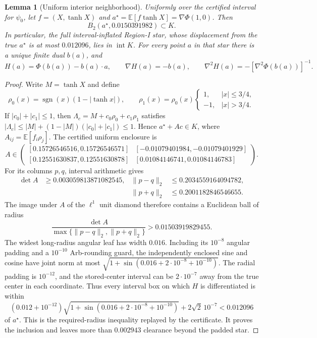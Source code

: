 \documentclass[11pt]{article}
\newtheorem{lemma}[theorem]{Lemma}
\newcommand{\E}{\mathbb{E}}
\begin{document}
\begin{lemma}[Uniform interior neighborhood]\label{lem:star-interior}
Uniformly over the certified interval for $\psi_0$, let $f=(X,\tanh X)$ and
$a^\star=\E[f\tanh X]=\nabla\Phi(1,0)$.  Then
\[
 B_2(a^\star,0.0150391982)\subset K.
\]
In particular, the full interval-inflated Region-I star, whose displacement
from the true $a^\star$ is at most
$0.012096$, lies in $\operatorname{int}K$.
For every point $a$ in that star there is a unique finite dual $b(a)$, and
\[
 H(a)=\Phi(b(a))-b(a)\cdot a,\qquad
 \nabla H(a)=-b(a),\qquad
 \nabla^2H(a)=-[\nabla^2\Phi(b(a))]^{-1}.
\]
\end{lemma}
\begin{proof}
Write $M=\tanh X$ and define
\[
 \rho_0(x)=\operatorname{sgn}(x)(1-|\tanh x|),\qquad
 \rho_1(x)=\rho_0(x)
 \begin{cases}1,&|x|\le3/4,\\-1,&|x|>3/4.
 \end{cases}
\]
If $|c_0|+|c_1|\le1$, then
$\Lambda_c=M+c_0\rho_0+c_1\rho_1$ satisfies
$|\Lambda_c|\le |M|+(1-|M|)(|c_0|+|c_1|)\le1$.  Hence
$a^\star+Ac\in K$, where $A_{ij}=\E[f_i\rho_j]$.  The certified uniform
enclosure is
\[
A\in\begin{pmatrix}
[0.15726546516,0.15726546571]&
[-0.01079401984,-0.01079401929]\\
[0.12551630837,0.12551630878]&
[0.01084146741,0.01084146783]
\end{pmatrix}.
\]
For its columns $p,q$, interval arithmetic gives
\[
 \begin{aligned}
 \det A&\ge0.003059813871082545,&
 \|p-q\|_2&\le0.2034559164094782,\\
 &&\|p+q\|_2&\le0.2001182846546655.
 \end{aligned}
\]
The image under $A$ of the $\ell^1$ unit diamond therefore contains a
Euclidean ball of radius
\[
 \frac{\det A}{\max\{\|p-q\|_2,\|p+q\|_2\}}
 >0.01503919829455.
\]
The widest long-radius angular leaf has width $0.016$.  Including its
$10^{-8}$ angular padding and a $10^{-10}$ Arb-rounding guard, the independently
enclosed sine and cosine have joint norm at most
$\sqrt{1+\sin(0.016+2\cdot10^{-8}+10^{-10})}$.  The radial padding is
$10^{-12}$, and the stored-center interval can be $2\cdot10^{-7}$ away
from the true center in each coordinate.  Thus every interval box on which
$H$ is differentiated is within
\[
 (0.012+10^{-12})\sqrt{1+\sin(0.016+2\cdot10^{-8}+10^{-10})}
 +2\sqrt2\,10^{-7}<0.012096
\]
of $a^\star$.  This is the required-radius inequality replayed by the
certificate.  It proves the inclusion and leaves more than $0.002943$
clearance beyond the padded star.


\end{proof}
\end{document}
